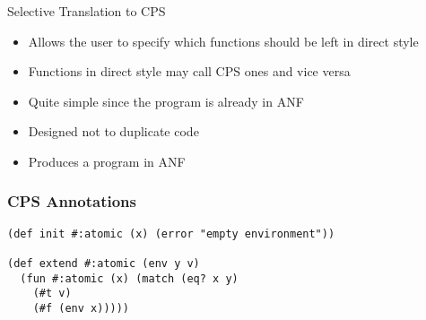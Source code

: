 \documentclass{beamer}
\begin{document}
\begin{frame}{Selective Translation to CPS}
  \begin{itemize}
    \item Allows the user to specify which functions should be left in direct style
    \item Functions in direct style may call CPS ones and vice versa \pause
    \item Quite simple since the program is already in ANF \pause
    \item Designed not to duplicate code
    \item Produces a program in ANF
  \end{itemize}
\end{frame}

\begin{frame}[fragile]
  \frametitle{CPS Annotations}
  \begin{lstlisting}
(def init #:atomic (x) (error "empty environment"))

(def extend #:atomic (env y v)
  (fun #:atomic (x) (match (eq? x y)
    (#t v)
    (#f (env x)))))
  \end{lstlisting}
\end{frame}
\end{document}
